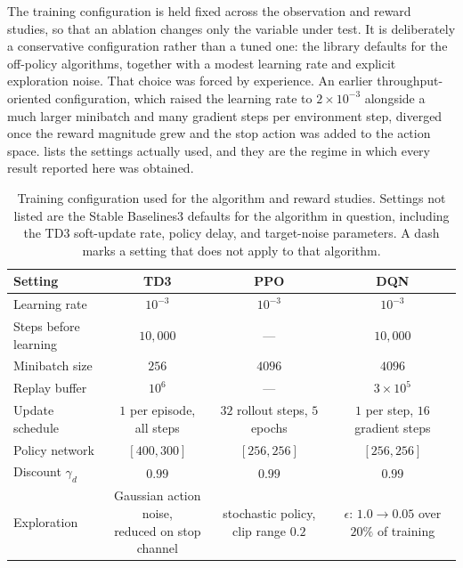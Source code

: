 The training configuration is held fixed across the observation and reward studies, so that an ablation changes only the variable under test. It is deliberately a conservative configuration rather than a tuned one: the library defaults for the off-policy algorithms, together with a modest learning rate and explicit exploration noise. That choice was forced by experience. An earlier throughput-oriented configuration, which raised the learning rate to $2\times10^{-3}$ alongside a much larger minibatch and many gradient steps per environment step, diverged once the reward magnitude grew and the stop action was added to the action space.  lists the settings actually used, and they are the regime in which every result reported here was obtained.

\begin{table}[H]
\centering
\caption{Training configuration used for the algorithm and reward studies. Settings not listed are the Stable Baselines3 defaults for the algorithm in question, including the TD3 soft-update rate, policy delay, and target-noise parameters. A dash marks a setting that does not apply to that algorithm.}
\label{tab:training_config}
\begin{tabular}{lccc}
\toprule
Setting & TD3 & PPO & DQN \\
\midrule
Learning rate            & $10^{-3}$        & $10^{-3}$       & $10^{-3}$ \\
Steps before learning    & $10{,}000$       & ---             & $10{,}000$ \\
Minibatch size           & $256$            & $4096$          & $4096$ \\
Replay buffer            & $10^{6}$         & ---             & $3\times10^{5}$ \\
Update schedule          & \makecell{$1$ per episode,\\all steps}  & \makecell{$32$ rollout steps,\\$5$ epochs} & \makecell{$1$ per step,\\$16$ gradient steps} \\
Policy network           & $[400, 300]$     & $[256, 256]$    & $[256, 256]$ \\
Discount $\gamma_d$      & $0.99$           & $0.99$          & $0.99$ \\
Exploration              & \makecell{Gaussian action noise,\\reduced on stop channel} & \makecell{stochastic policy,\\clip range $0.2$} & \makecell{$\epsilon$: $1.0 \rightarrow 0.05$\\over $20\%$ of training} \\
\bottomrule
\end{tabular}
\end{table}

